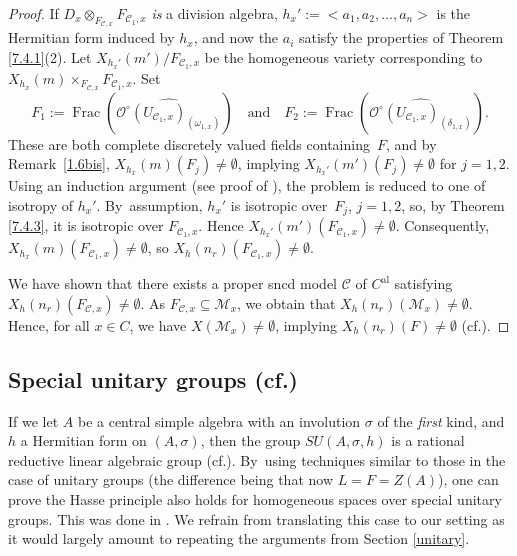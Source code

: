 \documentclass[10pt]{amsart}
\newcommand{\cf}{cf.}
\newcommand{\al}{\mathrm{al}}
\DeclareMathOperator{\Frac}{Frac}
\theoremstyle{definition}
\begin{document}
\begin{proof}
If $D_x \otimes_{F_{\mathscr{C},x}} F_{\mathscr{C}_1,x}$ \emph{is} a division algebra, $h_x':=<a_1, a_2, \dots, a_n>$ is the Hermitian form induced by $h_x$, and now the $a_i$
satisfy the properties of Theorem \ref{7.4.1}(2). Let $X_{h_x'}(m')/F_{\mathscr{C}_1,x}$ be the homogeneous variety corresponding to $X_{h_x}(m) \times_{F_{\mathscr{C},x}} F_{\mathscr{C}_1,x}$. Set
\[
F_1:=\Frac(\widehat{\mathcal{O}^{\circ}(U_{{\mathscr{C}_1,x}})_{(\omega_{1,x})}})\quad\text{and}\quad F_2:=\Frac(\widehat{\mathcal{O}^{\circ}(U_{\mathscr{C}_1,x})_{(\delta_{1,x})}}).
\]
These are both complete discretely valued fields containing~$F$, and by Remark~\ref{1.6bis}, $X_{h_x}(m)(F_j) \neq \emptyset$, implying $X_{h_x'}(m')(F_j) \neq \emptyset$ for $j=1,2$.
Using an induction argument (see proof of \cite[Th.\,12.2]{parsur}), the problem is reduced to one of isotropy of $h_x'$. By~assumption, $h_x'$ is isotropic over~$F_j$, $j=1,2$, so, by Theorem \ref{7.4.3}, it is isotropic over $F_{\mathscr{C}_1,x}$. Hence $X_{h_x'}(m')(F_{\mathscr{C}_1,x})\neq \emptyset$. Consequently, $X_{h_x}(m)(F_{\mathscr{C}_1,x}) \neq \emptyset$, so $X_{h}(n_r)(F_{\mathscr{C}_1,x}) \neq \emptyset$.

We have shown that there exists a proper sncd model $\mathscr{C}$ of $C^{\al}$ satisfying ${X_h(n_r)(F_{\mathscr{C},x}) \neq \emptyset}$. As $F_{\mathscr{C},x} \subseteq \mathscr{M}_x$, we obtain that $X_h(n_r)(\mathscr{M}_x) \neq \emptyset$.
Hence, for all $x \in C$, we have $X(\mathscr{M}_x) \neq \emptyset$, implying ${X_h(n_r)(F) \neq \emptyset}$ (\cf \cite[Th.\,3.11]{une}).
\end{proof}
\subsection{Special unitary groups (\cf \cite{wu})} \label{subsection7.2}
If we let $A$ be a central simple algebra with an involution $\sigma$ of the \emph{first} kind, and $h$ a Hermitian form on $(A, \sigma)$, then the group $\textit{SU}(A, \sigma, h)$ is a rational reductive linear algebraic group (\cf \cite[Lem.\,5]{plati}). By~using techniques similar to those in the case of unitary groups (the difference being that now ${L=F=Z(A)}$), one can prove the Hasse principle also holds for homogeneous spaces over special unitary groups. This was done in \cite{wu}. We refrain from translating this case to our setting as it would largely amount to repeating the arguments from Section \ref{unitary}.
\end{document}
